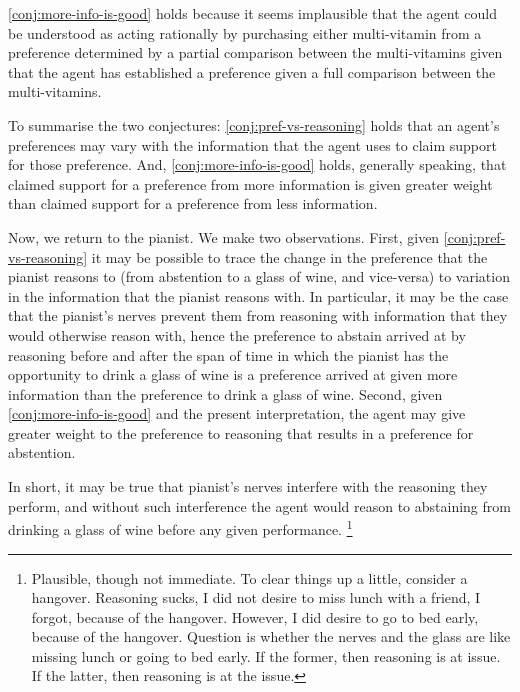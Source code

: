 \begin{note}
  \autoref{conj:more-info-is-good} holds because it seems implausible that the agent could be understood as acting rationally by purchasing either multi-vitamin from a preference determined by a partial comparison between the multi-vitamins given that the agent has established a preference given a full comparison between the multi-vitamins.
\end{note}

\begin{note}
  To summarise the two conjectures:
  \autoref{conj:pref-vs-reasoning} holds that an agent's preferences may vary with the information that the agent uses to claim support for those preference.
  And, \autoref{conj:more-info-is-good} holds, generally speaking, that claimed support for a preference from more information is given greater weight than claimed support for a preference from less information.

  Now, we return to the pianist.
  We make two observations.
  First, given \autoref{conj:pref-vs-reasoning} it may be possible to trace the change in the preference that the pianist reasons to (from abstention to a glass of wine, and vice-versa) to variation in the information that the pianist reasons with.
  In particular, it may be the case that the pianist's nerves prevent them from reasoning with information that they would otherwise reason with, hence the preference to abstain arrived at by reasoning before and after the span of time in which the pianist has the opportunity to drink a glass of wine is a preference arrived at given more information than the preference to drink a glass of wine.
  Second, given \autoref{conj:more-info-is-good} and the present interpretation, the agent may give greater weight to the preference to reasoning that results in a preference for abstention.

  In short, it may be true that pianist's nerves interfere with the reasoning they perform, and without such interference the agent would reason to abstaining from drinking a glass of wine before any given performance.\nolinebreak
  \footnote{
    \color{red}
    Plausible, though not immediate.
    To clear things up a little, consider a hangover.
    Reasoning sucks, I did not desire to miss lunch with a friend, I forgot, because of the hangover.
    However, I did desire to go to bed early, because of the hangover.
    Question is whether the nerves and the glass are like missing lunch or going to bed early.
    If the former, then reasoning is at issue.
    If the latter, then reasoning is at the issue.

}
\end{note}
